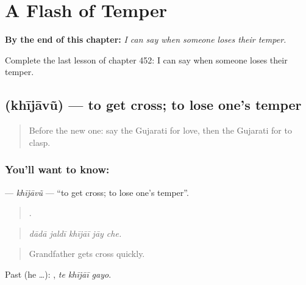 
\chapter{A Flash of Temper}
\label{ch:gu-a-flash-of-temper}

\begin{chapteropening}
\textbf{By the end of this chapter:} \emph{I can say when someone loses their temper.}

Complete the last lesson of chapter 452: I can say when someone loses their temper.
\end{chapteropening}

\section[\texorpdfstring{\gu{ખીજાવું} (khījāvũ)}{ખીજાવું (khījāvũ)}]{ (khījāvũ) — to get cross; to lose one's temper}

\label{lesson:GU-C452-khijavu}



\begin{quote}
Before the new one: say the Gujarati for love, then the Gujarati for to clasp.
\end{quote}

\subsection*{You'll want to know: }
\textbf{} — \emph{khījāvũ} — \textquotedblleft{}to get cross; to lose one's temper\textquotedblright{}.

\begin{quote}
    .
\end{quote}

\begin{quote}
\emph{dādā jaldī khījāī jāy che.}
\end{quote}

\begin{quote}
Grandfather gets cross quickly.
\end{quote}

Past (he …):   , \emph{te khījāī gayo}.


